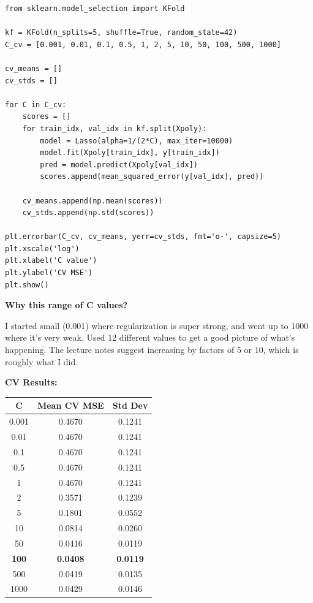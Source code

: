 \documentclass[11pt,a4paper]{article}
\begin{document}
\begin{lstlisting}
from sklearn.model_selection import KFold

kf = KFold(n_splits=5, shuffle=True, random_state=42)
C_cv = [0.001, 0.01, 0.1, 0.5, 1, 2, 5, 10, 50, 100, 500, 1000]

cv_means = []
cv_stds = []

for C in C_cv:
    scores = []
    for train_idx, val_idx in kf.split(Xpoly):
        model = Lasso(alpha=1/(2*C), max_iter=10000)
        model.fit(Xpoly[train_idx], y[train_idx])
        pred = model.predict(Xpoly[val_idx])
        scores.append(mean_squared_error(y[val_idx], pred))
    
    cv_means.append(np.mean(scores))
    cv_stds.append(np.std(scores))

plt.errorbar(C_cv, cv_means, yerr=cv_stds, fmt='o-', capsize=5)
plt.xscale('log')
plt.xlabel('C value')
plt.ylabel('CV MSE')
plt.show()
\end{lstlisting}

\textbf{Why this range of C values?}

I started small (0.001) where regularization is super strong, and went up to 1000 where it's very weak. Used 12 different values to get a good picture of what's happening. The lecture notes suggest increasing by factors of 5 or 10, which is roughly what I did.

\textbf{CV Results:}

\begin{table}[H]
\centering
\begin{tabular}{ccc}
\toprule
C & Mean CV MSE & Std Dev \\
\midrule
0.001 & 0.4670 & 0.1241 \\
0.01 & 0.4670 & 0.1241 \\
0.1 & 0.4670 & 0.1241 \\
0.5 & 0.4670 & 0.1241 \\
1 & 0.4670 & 0.1241 \\
2 & 0.3571 & 0.1239 \\
5 & 0.1801 & 0.0552 \\
10 & 0.0814 & 0.0260 \\
50 & 0.0416 & 0.0119 \\
\textbf{100} & \textbf{0.0408} & \textbf{0.0119} \\
500 & 0.0419 & 0.0135 \\
1000 & 0.0429 & 0.0146 \\
\bottomrule
\end{tabular}
\end{table}
\end{document}

